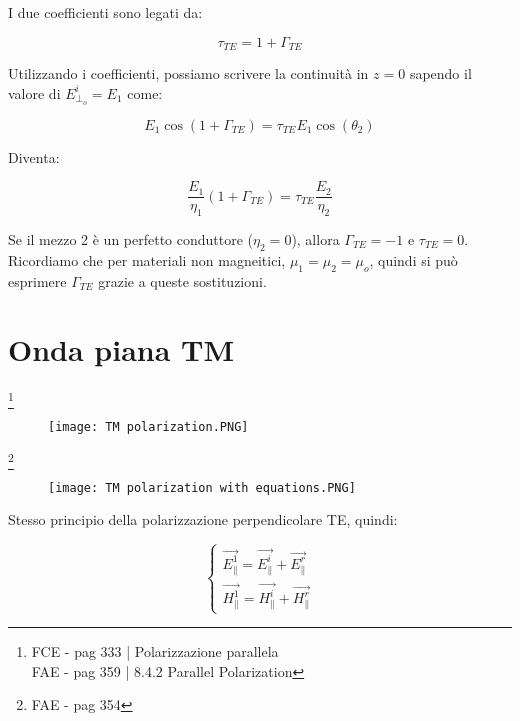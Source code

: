 I due coefficienti sono legati da: 

{\Large \begin{equation}
    \tau_{TE} = 1 + \Gamma_{TE} 
\end{equation}}

Utilizzando i coefficienti, possiamo scrivere la continuità in $z=0$ sapendo il valore di $E_{\perp_o}^{i} = E_1$ come: 

{\Large \begin{equation}
    E_1 \cos(1 + \Gamma_{TE}) = \tau_{TE} E_1 \cos(\theta_2)
\end{equation}} 

Diventa: 

{\Large \begin{equation}
    \frac{E_1}{\eta_1} (1 + \Gamma_{TE}) = \tau_{TE} \frac{E_2}{\eta_2}
\end{equation}} 


Se il mezzo 2 è un perfetto conduttore ($\eta_2 = 0$), allora $\Gamma_{TE} = -1$ e $\tau_{TE} = 0$. \\ 

Ricordiamo che per materiali non magneitici, $\mu_1 = \mu_2 = \mu_o$, quindi si può esprimere $\Gamma_{TE}$ grazie 
a queste sostituzioni. 


\newpage 

\section{Onda piana TM}

\footnote{FCE - pag 333 | Polarizzazione parallela \\ 
FAE - pag 359 | 8.4.2 Parallel Polarization} 

\begin{figure}[h]
    \centering
    \texttt{[image: TM polarization.PNG]}
    
\end{figure}   

\footnote{FAE - pag 354 } 

\begin{figure}[h]
    \centering
    \texttt{[image: TM polarization with equations.PNG]}
    
\end{figure}   

Stesso principio della polarizzazione perpendicolare TE, quindi: 

{\Large \begin{equation}
    \begin{cases}
        \vec{E_\parallel^{1}} = \vec{E_\parallel^{i}} + \vec{E_\parallel^{r}} \\ 
        \vec{H_\parallel^{1}} = \vec{H_\parallel^{i}} + \vec{H_\parallel^{r}}
    \end{cases}
\end{equation}}


